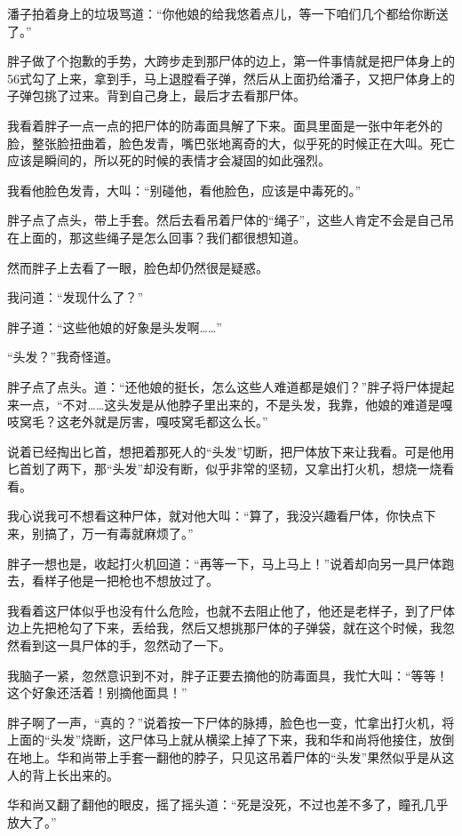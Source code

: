 潘子拍着身上的垃圾骂道：“你他娘的给我悠着点儿，等一下咱们几个都给你断送了。”

胖子做了个抱歉的手势，大跨步走到那尸体的边上，第一件事情就是把尸体身上的56式勾了上来，拿到手，马上退膛看子弹，然后从上面扔给潘子，又把尸体身上的子弹包挑了过来。背到自己身上，最后才去看那尸体。

我看着胖子一点一点的把尸体的防毒面具解了下来。面具里面是一张中年老外的脸，整张脸扭曲着，脸色发青，嘴巴张地离奇的大，似乎死的时候正在大叫。死亡应该是瞬间的，所以死的时候的表情才会凝固的如此强烈。

我看他脸色发青，大叫：“别碰他，看他脸色，应该是中毒死的。”

胖子点了点头，带上手套。然后去看吊着尸体的“绳子”，这些人肯定不会是自己吊在上面的，那这些绳子是怎么回事？我们都很想知道。

然而胖子上去看了一眼，脸色却仍然很是疑惑。

我问道：“发现什么了？”

胖子道：“这些他娘的好象是头发啊……”

“头发？”我奇怪道。

胖子点了点头。道：“还他娘的挺长，怎么这些人难道都是娘们？”胖子将尸体提起来一点，“不对……这头发是从他脖子里出来的，不是头发，我靠，他娘的难道是嘎吱窝毛？这老外就是厉害，嘎吱窝毛都这么长。”

说着已经掏出匕首，想把着那死人的“头发”切断，把尸体放下来让我看。可是他用匕首划了两下，那“头发”却没有断，似乎非常的坚韧，又拿出打火机，想烧一烧看看。

我心说我可不想看这种尸体，就对他大叫：“算了，我没兴趣看尸体，你快点下来，别搞了，万一有毒就麻烦了。”

胖子一想也是，收起打火机回道：“再等一下，马上马上！”说着却向另一具尸体跑去，看样子他是一把枪也不想放过了。

我看着这尸体似乎也没有什么危险，也就不去阻止他了，他还是老样子，到了尸体边上先把枪勾了下来，丢给我，然后又想挑那尸体的子弹袋，就在这个时候，我忽然看到这一具尸体的手，忽然动了一下。

我脑子一紧，忽然意识到不对，胖子正要去摘他的防毒面具，我忙大叫：“等等！这个好象还活着！别摘他面具！”

胖子啊了一声，“真的？”说着按一下尸体的脉搏，脸色也一变，忙拿出打火机，将上面的“头发”烧断，这尸体马上就从横梁上掉了下来，我和华和尚将他接住，放倒在地上。华和尚带上手套一翻他的脖子，只见这吊着尸体的“头发”果然似乎是从这人的背上长出来的。

华和尚又翻了翻他的眼皮，摇了摇头道：“死是没死，不过也差不多了，瞳孔几乎放大了。”

